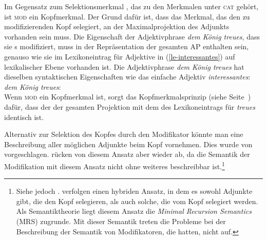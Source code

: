 Im Gegensatz zum Selektionsmerkmal \comps, das zu den Merkmalen unter \textsc{cat}  gehört,
ist \textsc{mod} ein Kopfmerkmal.
Der Grund dafür ist, dass das Merkmal, das den zu modifizierenden Kopf selegiert, an der
Maximalprojektion des Adjunkts vorhanden sein muss. Die Eigenschaft der Adjektivphrase \emph{dem
König treues}, dass sie \nbar{}s modifiziert, muss in der Repräsentation der gesamten AP enthalten sein,
genauso wie sie im Lexikoneintrag für Adjektive in (\ref{le-interessantes}) auf lexikalischer Ebene
vorhanden ist. Die Adjektivphrase \emph{dem König treues} hat dieselben syntaktischen Eigenschaften wie das einfache
Adjektiv \emph{interessantes}:
\ea
\label{avm-dem-koenig-treues}
\emph{dem König treues}:\\
\z
Wenn \textsc{mod} ein Kopfmerkmal ist, sorgt das Kopfmerkmalsprinzip (siehe Seite~\pageref{prinzip-hfp})
dafür, dass der \modw der gesamten Projektion mit dem \modw des Lexikoneintrags für \emph{treues} identisch ist.


Alternativ zur Selektion des Kopfes durch den Modifikator könnte man eine
Beschreibung aller möglichen Adjunkte beim Kopf vornehmen. Dies wurde von
\citet[]{ps} vorgeschlagen. \citet[Abschnitt~1.9]{ps2} rücken von diesem Ansatz aber wieder
ab, da die Semantik der Modifikation mit diesem Ansatz nicht ohne weiteres
beschreibbar ist.\footnote{
        Siehe jedoch . \citet*{BMS2001a} verfolgen einen hybriden Ansatz, in dem es sowohl Adjunkte gibt,
        die den Kopf selegieren, als auch solche, die vom Kopf selegiert werden.
        Als Semantiktheorie liegt diesem Ansatz die \textit{Minimal Recursion Semantics}
        (MRS)
        zugrunde. Mit dieser Semantik treten die Probleme bei der Beschreibung der Semantik
        von Modifikatoren, die \citet*{ps} hatten, nicht auf.
}


